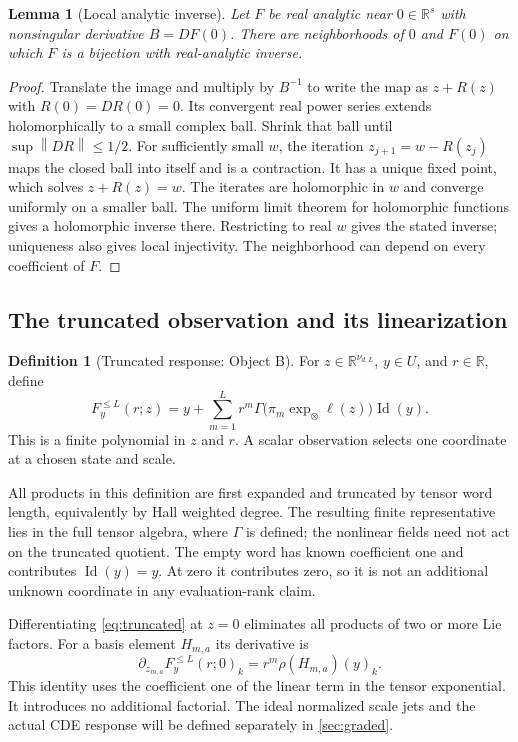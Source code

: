 \documentclass[11pt,a4paper]{article}
\numberwithin{equation}{section}
\newtheorem{lemma}[theorem]{Lemma}
\theoremstyle{definition}
\newtheorem{definition}[theorem]{Definition}
\theoremstyle{remark}
\DeclareMathOperator{\Id}{Id}
\newcommand{\R}{\mathbb R}
\newcommand{\norm}[1]{\left\lVert #1\right\rVert}
\begin{document}
\begin{lemma}[Local analytic inverse]\label{lem:inverse}
Let $F$ be real analytic near $0\in\R^s$ with nonsingular derivative
$B=DF(0)$. There are neighborhoods of $0$ and $F(0)$ on which $F$ is a
bijection with real-analytic inverse.
\end{lemma}
\begin{proof}
Translate the image and multiply by $B^{-1}$ to write the map as
$z+R(z)$ with $R(0)=DR(0)=0$. Its convergent real power series extends
holomorphically to a small complex ball. Shrink that ball until
$\sup\norm{DR}\leq1/2$. For sufficiently small $w$, the iteration
$z_{j+1}=w-R(z_j)$ maps the closed ball into itself and is a contraction.
It has a unique fixed point, which solves $z+R(z)=w$. The iterates are
holomorphic in $w$ and converge uniformly on a smaller ball. The uniform
limit theorem for holomorphic functions gives a holomorphic inverse there.
Restricting to real $w$ gives the stated inverse; uniqueness also gives
local injectivity. The neighborhood can depend on every coefficient of $F$.
\end{proof}

\subsection{The truncated observation and its linearization}
\begin{definition}[Truncated response: Object B]
For $z\in\R^{\nu_{d,L}}$, $y\in U$, and $r\in\R$, define
\begin{equation}\label{eq:truncated}
 F_y^{\leq L}(r;z)=y+\sum_{m=1}^L r^m
 \Gamma\bigl(\pi_m\exp_\otimes\ell(z)\bigr)\Id(y).
\end{equation}
This is a finite polynomial in $z$ and $r$. A scalar observation selects
one coordinate at a chosen state and scale.
\end{definition}
All products in this definition are first expanded and truncated by
tensor word length, equivalently by Hall weighted degree. The resulting
finite representative lies in the full tensor algebra, where $\Gamma$
is defined; the nonlinear fields need not act on the truncated quotient.
The empty word has known coefficient one and contributes $\Id(y)=y$.
At zero it contributes zero, so it is not an additional unknown
coordinate in any evaluation-rank claim.

Differentiating \eqref{eq:truncated} at $z=0$ eliminates all products of
two or more Lie factors. For a basis element $H_{m,a}$ its derivative is
\begin{equation}\label{eq:zero_derivative}
 \partial_{z_{m,a}}F_y^{\leq L}(r;0)_k
 =r^m\rho(H_{m,a})(y)_k.
\end{equation}
This identity uses the coefficient one of the linear term in the tensor
exponential. It introduces no additional factorial. The ideal normalized
scale jets and the actual CDE response will be defined separately in
\cref{sec:graded}.
\end{document}
